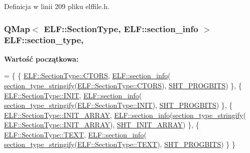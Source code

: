 Definicja w linii 209 pliku elffile.\-h.

\hypertarget{class_e_l_f_a083e9dd23053d80114879323b38927cc}{
\subsubsection[{section\-\_\-type}]{\setlength{\rightskip}{0pt plus 5cm}Q\-Map$<$ {\bf E\-L\-F\-::\-Section\-Type}, {\bf E\-L\-F\-::section\-\_\-info} $>$ E\-L\-F\-::section\-\_\-type\hspace{0.3cm}{\ttfamily [static]}, {\ttfamily [private]}}}\label{class_e_l_f_a083e9dd23053d80114879323b38927cc}
{\bfseries Wartość początkowa\-:}
\begin{DoxyCode}
= \{
    \{ \hyperlink{class_e_l_f_abaebdfb7048441e430684d68df8d73d1a02f11aadd3ab1bd5b7ccd3040d8a0075}{ELF::SectionType::CTORS},      \hyperlink{class_e_l_f_a453c51d672396e7f5f328153f55e94bc}{ELF::section\_info}(
      \hyperlink{elffile_8cpp_a554451514a55fccb0c286a1368a80a30}{section\_type\_stringify}(\hyperlink{class_e_l_f_abaebdfb7048441e430684d68df8d73d1a02f11aadd3ab1bd5b7ccd3040d8a0075}{ELF::SectionType::CTORS}),      
      \hyperlink{elf_8h_a4bff22edbae51353ba9b3572d424b91a}{SHT\_PROGBITS})   \},
    \{ \hyperlink{class_e_l_f_abaebdfb7048441e430684d68df8d73d1afaee4ca3c30ee18148ce3ada37466498}{ELF::SectionType::INIT},       \hyperlink{class_e_l_f_a453c51d672396e7f5f328153f55e94bc}{ELF::section\_info}(
      \hyperlink{elffile_8cpp_a554451514a55fccb0c286a1368a80a30}{section\_type\_stringify}(\hyperlink{class_e_l_f_abaebdfb7048441e430684d68df8d73d1afaee4ca3c30ee18148ce3ada37466498}{ELF::SectionType::INIT}),       
      \hyperlink{elf_8h_a4bff22edbae51353ba9b3572d424b91a}{SHT\_PROGBITS})   \},
    \{ \hyperlink{class_e_l_f_abaebdfb7048441e430684d68df8d73d1a8c11d1b1290b76379bf90434c0e83f4a}{ELF::SectionType::INIT\_ARRAY}, 
      \hyperlink{class_e_l_f_a453c51d672396e7f5f328153f55e94bc}{ELF::section\_info}(\hyperlink{elffile_8cpp_a554451514a55fccb0c286a1368a80a30}{section\_type\_stringify}(
      \hyperlink{class_e_l_f_abaebdfb7048441e430684d68df8d73d1a8c11d1b1290b76379bf90434c0e83f4a}{ELF::SectionType::INIT\_ARRAY}), \hyperlink{elf_8h_aa0269f148b09419d27be6289b4ce026f}{SHT\_INIT\_ARRAY}) \},
    \{ \hyperlink{class_e_l_f_abaebdfb7048441e430684d68df8d73d1a61a96ffcb251bb9bf0abf8fec19d0ea8}{ELF::SectionType::TEXT},       \hyperlink{class_e_l_f_a453c51d672396e7f5f328153f55e94bc}{ELF::section\_info}(
      \hyperlink{elffile_8cpp_a554451514a55fccb0c286a1368a80a30}{section\_type\_stringify}(\hyperlink{class_e_l_f_abaebdfb7048441e430684d68df8d73d1a61a96ffcb251bb9bf0abf8fec19d0ea8}{ELF::SectionType::TEXT}),       
      \hyperlink{elf_8h_a4bff22edbae51353ba9b3572d424b91a}{SHT\_PROGBITS})   \}
\}
\end{DoxyCode}


